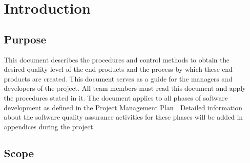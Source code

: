 \chapter{Introduction}

\section{Purpose}
This document describes the procedures and control methods to obtain the desired quality level of the end products and the process by which these end products are created. This document serves as a guide for the managers and developers of the \projectname project. All team members must read this document and apply the procedures stated in it. The document applies to all phases of software development as defined in the Project Management Plan \cite{spmp}. Detailed information about the software quality assurance activities for these phases will be added in appendices during the project.

\section{Scope}
